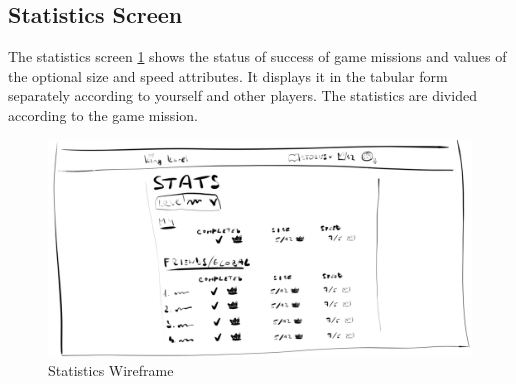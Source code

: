 \subsection{Statistics Screen}

The statistics screen \ref{fig:design:wir:statistics} shows the status of success of game missions and values of the optional size and speed attributes.
It displays it in the tabular form separately according to yourself and other players.
The statistics are divided according to the game mission.

\begin{figure}
    \centering
    \includegraphics[width=1\linewidth]{assets/design/ui/wir_stats.png}
    \caption{Statistics Wireframe}
    \label{fig:design:wir:statistics}
\end{figure}
